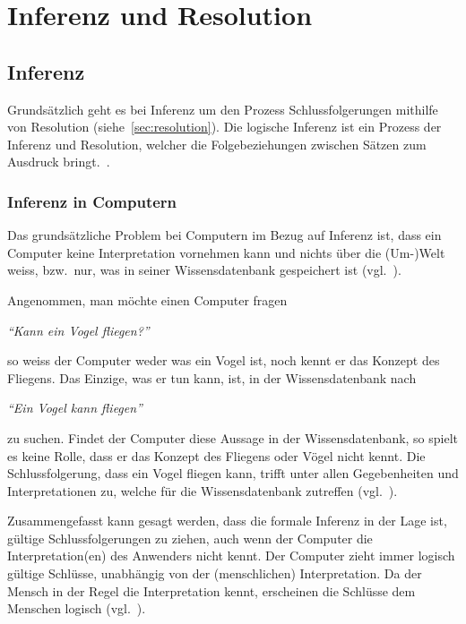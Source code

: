 \chapter{Inferenz und Resolution}
\label{chap:inferenz_resolution}

\section{Inferenz}
\label{sec:inferenz}
Grundsätzlich geht es bei Inferenz um den Prozess Schlussfolgerungen mithilfe von Resolution (siehe~\ref{sec:resolution}). Die logische Inferenz ist ein Prozess der Inferenz und Resolution, welcher die Folgebeziehungen zwischen Sätzen zum Ausdruck bringt.~\cite[S. 163]{russel}.

\subsection{Inferenz in Computern}
\label{subsec:inferenz-in-computer}

Das grundsätzliche Problem bei Computern im Bezug auf Inferenz ist, dass ein Computer keine Interpretation vornehmen kann und nichts über die (Um-)Welt weiss, bzw.\ nur, was in seiner Wissensdatenbank gespeichert ist (vgl.~\citet[S. 164]{russel}).


Angenommen, man möchte einen Computer fragen

    \noindent\hspace*{12mm}\textit{``Kann ein Vogel fliegen?''}

so weiss der Computer weder was ein Vogel ist, noch kennt er das Konzept des Fliegens. Das Einzige, was er tun kann, ist, in der Wissensdatenbank nach 

    \noindent\hspace*{12mm}\textit{``Ein Vogel kann fliegen''}

zu suchen. Findet der Computer diese Aussage in der Wissensdatenbank, so spielt es keine Rolle, dass er das Konzept des Fliegens oder Vögel nicht kennt. Die Schlussfolgerung, dass ein Vogel fliegen kann, trifft unter allen Gegebenheiten und Interpretationen zu, welche für die Wissensdatenbank zutreffen (vgl.~\cite[S.164]{russel}).

Zusammengefasst kann gesagt werden, dass die formale Inferenz in der Lage ist, gültige Schlussfolgerungen zu ziehen, auch wenn der Computer die Interpretation(en) des Anwenders nicht kennt. Der Computer zieht immer logisch gültige Schlüsse, unabhängig von der (menschlichen) Interpretation. Da der Mensch in der Regel die Interpretation kennt, erscheinen die Schlüsse dem Menschen logisch (vgl.~\cite[S. 165]{russel}).

